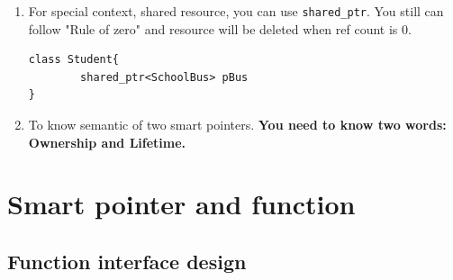 \documentclass[a4paper,11pt,twoside]{book}
\begin{document}
\begin{itemize}
\begin{enumerate}
		\item For special context, shared resource, you can use \texttt{shared\_ptr}.  You still can follow "Rule of zero" and resource will be deleted when ref count is 0.
\begin{lstlisting}[numbers=none]
class Student{
		shared_ptr<SchoolBus> pBus
}
\end{lstlisting}
		
		\item To know semantic of two smart pointers. \textbf{You need to know two words: Ownership and Lifetime.}
	\end{enumerate}
\end{itemize}

\section{Smart pointer and function}
\subsection{Function interface design}
\end{document}
